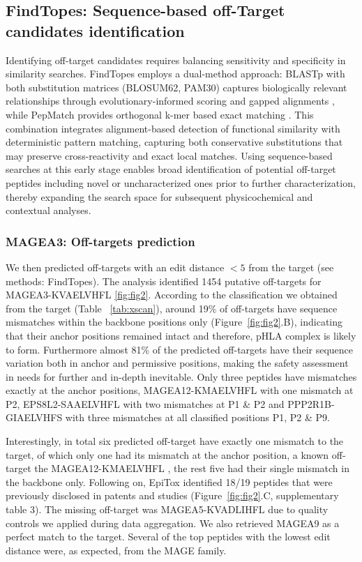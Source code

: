 \documentclass[unnumsec,webpdf,contemporary,large]{oup-authoring-template}%
\theoremstyle{thmstyleone}%
\theoremstyle{thmstyletwo}%
\theoremstyle{thmstylethree}%
\begin{document}
    \subsection{\textbf{FindTopes: Sequence-based off-Target candidates identification}}
        Identifying off-target candidates requires balancing sensitivity and specificity in similarity searches. FindTopes employs a dual-method approach: BLASTp with both substitution matrices (BLOSUM62, PAM30) captures biologically relevant relationships through evolutionary-informed scoring and gapped alignments \cite{mahram2015ncbi}, while PepMatch provides orthogonal k-mer based exact matching \cite{marrama2023pepmatch}. This combination integrates alignment-based detection of functional similarity with deterministic pattern matching, capturing both conservative substitutions that may preserve cross-reactivity and exact local matches. Using sequence-based searches at this early stage enables broad identification of potential off-target peptides including novel or uncharacterized ones prior to further characterization, thereby expanding the search space for subsequent physicochemical and contextual analyses.
        
        \subsubsection{\textbf{MAGEA3: Off-targets prediction}}
        We then predicted off-targets with an edit distance $<5$ from the target (see methods: FindTopes). The analysis identified 1454 putative off-targets for MAGEA3-KVAELVHFL \ref{fig:fig2}.
        According to the classification we obtained from the target (Table~ \ref{tab:xscan}), around 19\% of off-targets have sequence mismatches within the backbone positions only (Figure~\ref{fig:fig2}.B), indicating that their anchor positions remained intact and therefore, pHLA complex is likely to form. Furthermore almost 81\% of the predicted off-targets have their sequence variation both in anchor and permissive positions, making the safety assessment in needs for further and in-depth inevitable. Only three peptides have mismatches exactly at the anchor positions, MAGEA12-KMAELVHFL with one mismatch at P2, EPS8L2-SAAELVHFL with two mismatches at P1 \& P2 and PPP2R1B-GIAELVHFS with three mismatches at all classified positions P1, P2 \& P9.
        
        Interestingly, in total six predicted off-target have exactly one mismatch to the target, of which only one had its mismatch at the anchor position, a known off-target the MAGEA12-KMAELVHFL \cite{martin2021re, morgan2013cancer}, the rest five had their single mismatch in the backbone only. Following on, EpiTox identified 18/19 peptides that were previously disclosed in patents and studies (Figure~\ref{fig:fig2}.C, supplementary table 3)\cite{WO2021173674A1, chinnasamy2011tcr, morgan2013cancer, dhanik2016silico}. The missing off-target was MAGEA5-KVADLIHFL due to quality controls we applied during data aggregation. We also retrieved MAGEA9 as a perfect match to the target. Several of the top peptides with the lowest edit distance were, as expected, from the MAGE family.
        
\end{document}
